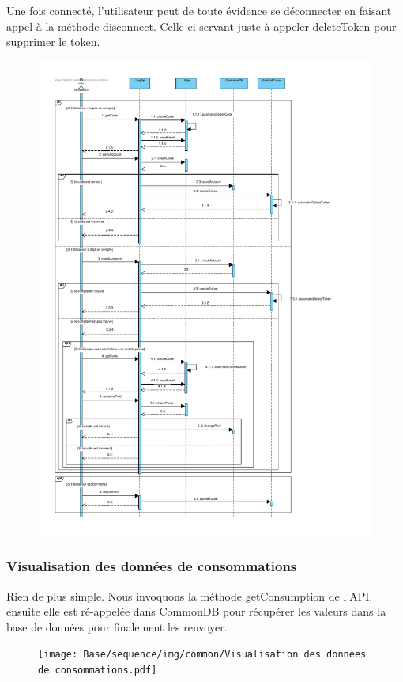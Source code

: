 \begin{flushleft}
Une fois connecté, l'utilisateur peut de toute évidence se déconnecter en faisant appel à la méthode disconnect. Celle-ci servant juste à appeler deleteToken pour supprimer le token.
\end{flushleft}

\newpage
\begin{figure}[h]
\centering
\includegraphics[height = 1\textwidth]{Base/sequence/img/common/S'authentifier.pdf}
\end{figure}

\newpage
\subsubsection{Visualisation des données de consommations}

\begin{flushleft}
Rien de plus simple. Nous invoquons la méthode getConsumption de l'API, ensuite elle est ré-appelée dans CommonDB pour récupérer les valeurs dans la base de données pour finalement les renvoyer.
\end{flushleft}

\begin{figure}[h]
\centering
\texttt{[image: Base/sequence/img/common/Visualisation des données de consommations.pdf]}
\end{figure}

